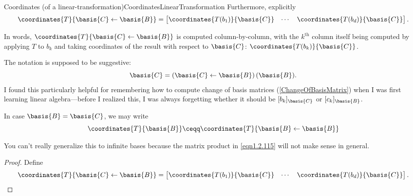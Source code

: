 \begin{thm}{Coordinates (of a linear-transformation)}{CoordinatesLinearTransformation}
	Furthermore, explicitly
	\begin{equation}
		\coordinates{T}{\basis{C}\leftarrow \basis{B}}=\begin{bmatrix}\coordinates{T(b_1)}{\basis{C}} & \cdots & \coordinates{T(b_d)}{\basis{C}}\end{bmatrix}.
	\end{equation}
	\begin{rmk}
		In words, $\coordinates{T}{\basis{C}\leftarrow \basis{B}}$ is computed column-by-column, with the $k^{\text{th}}$ column itself being computed by applying $T$ to $b_k$ and taking coordinates of the result with respect to $\basis{C}$:  $\coordinates{T(b_k)}{\basis{C}}$.
	\end{rmk}
	\begin{rmk}
		The notation is supposed to be suggestive:
		\begin{equation}
			\basis{C}=(\basis{C}\leftarrow \basis{B})\, (\basis{B}).
		\end{equation}
		I found this particularly helpful for remembering how to compute change of basis matrices (\cref{ChangeOfBasisMatrix}) when I was first learning linear algebra---before I realized this, I was always forgetting whether it should be $[b_k]_{\basis{C}}$ or $[c_k]_{\basis{B}}$.
	\end{rmk}
	\begin{rmk}
		In case $\basis{B}=\basis{C}$, we may write
		\begin{equation}
			\coordinates{T}{\basis{B}}\ceqq \coordinates{T}{\basis{B}\leftarrow \basis{B}}
		\end{equation}
	\end{rmk}
	\begin{rmk}
		You can't really generalize this to infinite bases because the matrix product in \eqref{eqn1.2.115} will not make sense in general.
	\end{rmk}
	\begin{proof}
		Define
		\begin{equation}
			\coordinates{T}{\basis{C}\leftarrow \basis{B}}=\begin{bmatrix}\coordinates{T(b_1)}{\basis{C}} & \cdots & \coordinates{T(b_d)}{\basis{C}}\end{bmatrix}.
		\end{equation}
		

\end{proof}
\end{thm}

